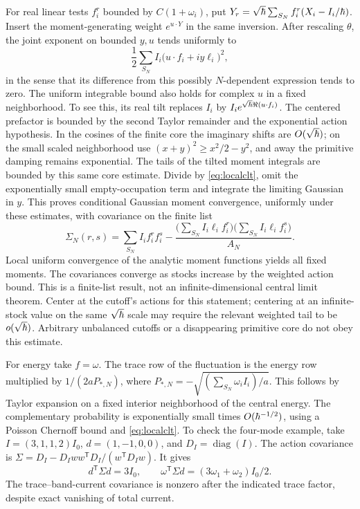 For real linear tests \(f_i^r\) bounded by \(C(1+\omega_i)\), put
\(Y_r=\sqrt{\hbar}\sum_{S_N}f_i^r(X_i-I_i/\hbar)\).
Insert the moment-generating weight \(e^{u\cdot Y}\) in the same inversion. After rescaling \(\theta\), the joint exponent on bounded \(y,u\) tends uniformly to
\[
       \frac12\sum_{S_N} I_i \bigl(u\cdot f_i+i y\ell_i\bigr)^2 ,
\]
in the sense that its difference from this possibly \(N\)-dependent expression tends to zero. The uniform integrable bound also holds for complex \(u\) in a fixed neighborhood. To see this, its real tilt replaces \(I_i\) by \(I_i e^{\sqrt{\hbar}\Re(u\cdot f_i)}\). The centered prefactor is bounded by the second Taylor remainder and the exponential action hypothesis. In the cosines of the finite core the imaginary shifts are \(O(\sqrt{\hbar})\); on the small scaled neighborhood use \((x+y)^2\geq x^2/2-y^2\), and away the primitive damping remains exponential. The tails of the tilted moment integrals are bounded by this same core estimate. Divide by \eqref{eq:localclt}, omit the exponentially small empty-occupation term and integrate the limiting Gaussian in \(y\). This proves conditional Gaussian moment convergence, uniformly under these estimates, with covariance on the finite list
\begin{equation}\label{eq:cov}
 \Sigma_N(r,s)=\sum_{S_N} I_i f_i^r f_i^s
        -\frac{\bigl(\sum_{S_N} I_i\ell_i f_i^r\bigr)
                \bigl(\sum_{S_N} I_i\ell_i f_i^s\bigr)}{A_N}.
\end{equation}
Local uniform convergence of the analytic moment functions yields all fixed moments. The covariances converge as stocks increase by the weighted action bound. This is a finite-list result, not an infinite-dimensional central limit theorem. Center at the cutoff's actions for this statement; centering at an infinite-stock value on the same \(\sqrt{\hbar}\) scale may require the relevant weighted tail to be \(o(\sqrt{\hbar})\). Arbitrary unbalanced cutoffs or a disappearing primitive core do not obey this estimate.

For energy take \(f=\omega\). The trace row of the fluctuation is the energy row multiplied by \(1/(2aP_{*,N})\), where \(P_{*,N}=-\sqrt{(\sum_{S_N}\omega_i I_i)/a}\). This follows by Taylor expansion on a fixed interior neighborhood of the central energy. The complementary probability is exponentially small times \(O(\hbar^{-1/2})\), using a Poisson Chernoff bound and \eqref{eq:localclt}. To check the four-mode example, take \(I=(3,1,1,2)I_0\), \(d=(1,-1,0,0)\), and \(D_I=\operatorname{diag}(I)\). The action covariance is \(\Sigma=D_I-D_I ww^{\mathsf T}D_I/(w^{\mathsf T}D_Iw)\). It gives
\[
      d^{\mathsf T}\Sigma d=3I_0,\qquad
      \omega^{\mathsf T}\Sigma d=(3\omega_1+\omega_2)I_0/2.
\]
The trace--band-current covariance is nonzero after the indicated trace factor, despite exact vanishing of total current.

